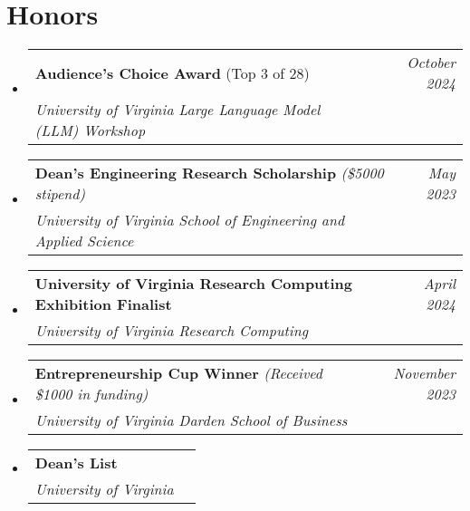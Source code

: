 \documentclass[letterpaper,11pt]{article}
\makeatletter
\newcommand{\honoritem}[4]{
  \vspace{-1pt}\item
    \begin{tabular*}{0.97\textwidth}{l@{\extracolsep{\fill}}r}
      #1 & \textit{\small #2} \\
      \textit{\small#3} & \textit{\small #4} \\
    \end{tabular*}\vspace{-5pt}
}
\newcommand{\resumeSubHeadingListStart}{\begin{itemize}[leftmargin=*]}
\newcommand{\resumeSubHeadingListEnd}{\end{itemize}}
\makeatother
\begin{document}

\section{Honors}
\resumeSubHeadingListStart
\honoritem
{\textbf{Audience's Choice Award} (Top 3 of 28)}{\textit{October 2024}}
{University of Virginia Large Language Model (LLM) Workshop}{}
\honoritem
{\textbf{Dean's Engineering Research Scholarship} \textit{(\$5000 stipend)}}{\textit{May 2023}}
{University of Virginia School of Engineering and Applied Science}{}
\honoritem
{\textbf{University of Virginia Research Computing Exhibition Finalist}}{\textit{April 2024}}
{University of Virginia Research Computing}{}
\honoritem
{\textbf{Entrepreneurship Cup Winner} \textit{(Received \$1000 in funding)}}{\textit{November 2023}}
{University of Virginia Darden School of Business}{}
\honoritem
{\textbf{Dean's List}}{}{University of Virginia}{}
\resumeSubHeadingListEnd




\end{document}
